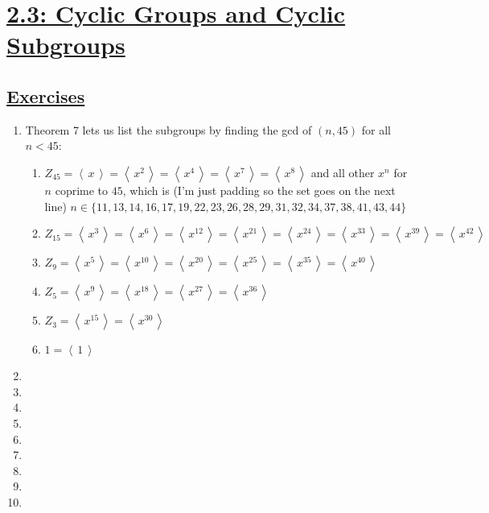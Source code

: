 \documentclass[]{article}
\newcommand{\gen}[1]{\left\langle\, #1 \,\right\rangle}
\begin{document}
\section*{\underline{2.3: Cyclic Groups and Cyclic Subgroups}}
\subsection*{\underline{Exercises}}
\begin{enumerate}

\item Theorem 7 lets us list the subgroups by finding the gcd of $(n,45)$ for all $n<45$:
\begin{enumerate}
\item $Z_{45} = \gen{x} = \gen{x^2} = \gen{x^4} = \gen{x^7} = \gen{x^8}$ and all other $x^n$ for $n$ coprime to $45$, which is (I'm just padding so the set goes on the next line) $n \in \{11,13,14,16,17,19,22,23,26,28,29,31,32,34,37,38,41,43,44 \}$
\item $Z_{15} = \gen{x^3} = \gen{x^6} = \gen{x^{12}} = \gen{x^{21}} = \gen{x^{24}} = \gen{x^{33}} = \gen{x^{39}} = \gen{x^{42}}$
\item $Z_{9} = \gen{x^5} = \gen{x^{10}} = \gen{x^{20}} = \gen{x^{25}} = \gen{x^{35}} = \gen{x^{40}}$
\item $Z_{5} = \gen{x^9} = \gen{x^{18}} = \gen{x^{27}} = \gen{x^{36}}$
\item $Z_{3} = \gen{x^{15}} = \gen{x^{30}}$
\item $1 = \gen{1}$

\end{enumerate}


\item 


\item 


\item 


\item 


\item 


\item 


\item 


\item 


\item 



\end{enumerate}
\end{document}
